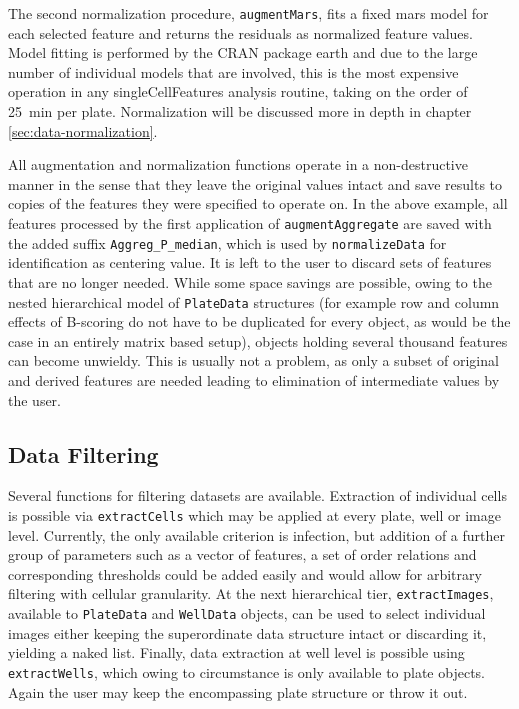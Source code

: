 The second normalization procedure, \texttt{augmentMars}, fits a fixed \gls{mars} model for each selected feature and returns the residuals as normalized feature values. Model fitting is performed by the CRAN package earth \citep{Hastie2015} and due to the large number of individual models that are involved, this is the most expensive operation in any singleCellFeatures analysis routine, taking on the order of \SI{25}{\minute} per plate. Normalization will be discussed more in depth in chapter \ref{sec:data-normalization}.

All augmentation and normalization functions operate in a non-destructive manner in the sense that they leave the original values intact and save results to copies of the features they were specified to operate on. In the above example, all features processed by the first application of \texttt{augmentAggregate} are saved with the added suffix \texttt{Aggreg_P_median}, which is used by \texttt{normalizeData} for identification as centering value. It is left to the user to discard sets of features that are no longer needed. While some space savings are possible, owing to the nested hierarchical model of \texttt{PlateData} structures (for example row and column effects of B-scoring do not have to be duplicated for every object, as would be the case in an entirely matrix based setup), objects holding several thousand features can become unwieldy. This is usually not a problem, as only a subset of original and derived features are needed leading to elimination of intermediate values by the user.

\subsection{Data Filtering}
Several functions for filtering datasets are available. Extraction of individual cells is possible via \texttt{extractCells} which may be applied at every plate, well or image level. Currently, the only available criterion is infection, but addition of a further group of parameters such as a vector of features, a set of order relations and corresponding thresholds could be added easily and would allow for arbitrary filtering with cellular granularity. At the next hierarchical tier, \texttt{extractImages}, available to \texttt{PlateData} and \texttt{WellData} objects, can be used to select individual images either keeping the superordinate data structure intact or discarding it, yielding a naked list. Finally, data extraction at well level is possible using \texttt{extractWells}, which owing to circumstance is only available to plate objects. Again the user may keep the encompassing plate structure or throw it out.

